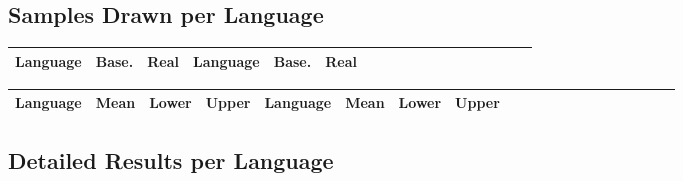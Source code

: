 \documentclass[11pt,letterpaper]{article}
\begin{document}
\subsection{Samples Drawn per Language}

\begin{center}
\begin{longtable}{l|ll||l|llllllllllllll}
	Language & Base. & Real & Language & Base. & Real \\ \hline

\end{longtable}
	\label{tab:samples}
\end{center}



\begin{center}
\begin{longtable}{l|lll||l|lllllllllllllll}
	Language & Mean & Lower & Upper & Language & Mean & Lower & Upper \\ \hline

\end{longtable}
	\label{tab:boot-g}
\end{center}


\subsection{Detailed Results per Language}
\end{document}
